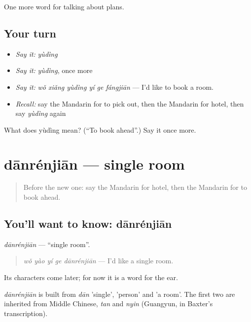\begin{grammarlens}[title={What you've built}]
One more word for talking about plans.
\end{grammarlens}

\subsection*{Your turn}
\begin{itemize}
\raggedright
  \item \emph{Say it:} \emph{yùdìng}
  \item \emph{Say it:} \emph{yùdìng}, once more
  \item \emph{Say it:} \emph{wǒ xiǎng yùdìng yí ge fángjiān} — I'd like to book a room.
  \item \emph{Recall:} say the Mandarin for to pick out, then the Mandarin for hotel, then say \emph{yùdìng} again
\end{itemize}

\begin{tcolorbox}[breakable,colback=teal!4,colframe=teal!35!black,title={Before you move on}]
What does yùdìng mean? (\textquotedblleft{}To book ahead\textquotedblright{}.) Say it once more.
\end{tcolorbox}
\section[dānrénjiān]{dānrénjiān — single room}

\label{lesson:ZH-C200-danrenjian}



\begin{quote}
Before the new one: say the Mandarin for hotel, then the Mandarin for to book ahead.
\end{quote}

\subsection*{You'll want to know: dānrénjiān}
\emph{dānrénjiān} — \textquotedblleft{}single room\textquotedblright{}.

\begin{quote}
\emph{wǒ yào yí ge dānrénjiān} — I'd like a single room.
\end{quote}

Its characters come later; for now it is a word for the ear.

\begin{cousinweb}
\emph{dānrénjiān} is built from \emph{dān} 'single',  'person' and  'a room'. The first two are inherited from Middle Chinese, \emph{tan} and \emph{nyin} (Guangyun, in Baxter's transcription).
\end{cousinweb}

